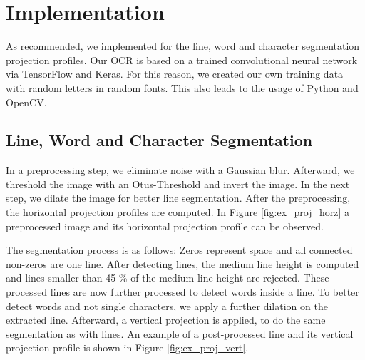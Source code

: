 \documentclass[english, paper=a4]{scrartcl}
\begin{document}
\section{Implementation}
As recommended, we implemented for the line, word and character segmentation projection profiles. 
Our OCR is based on a trained convolutional neural network via TensorFlow and Keras. For this reason, we created our own training data with random letters in random fonts. This also leads to the usage of Python and OpenCV.

\subsection{Line, Word and Character Segmentation}
In a preprocessing step, we eliminate noise with a Gaussian blur. Afterward, we threshold the image with an Otus-Threshold and invert the image. In the next step, we dilate the image for better line segmentation.
After the preprocessing, the horizontal projection profiles are computed. In Figure \ref{fig:ex_proj_horz}
a preprocessed image and its horizontal projection profile can be observed. 

The segmentation process is as follows:
Zeros represent space and all connected non-zeros are one line. After detecting lines, the medium line height is computed
and lines smaller than 45 \% of the medium line height are rejected. 
These processed lines are now further processed to detect words inside a line. To better detect words
and not single characters, we apply a further dilation on the extracted line. Afterward, a vertical projection is applied, to do the same segmentation as with lines. An example of a post-processed line and its vertical
projection profile is shown in Figure \ref{fig:ex_proj_vert}.
\end{document}

